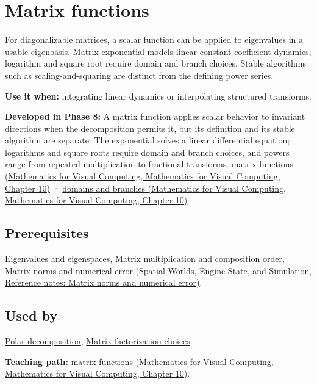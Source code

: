 \hypertarget{appendix-0f4bc2bf2b1f}{}\label{referencestart:appendix-0f4bc2bf2b1f}
\section{Matrix functions}\label{appendix-0f4bc2bf2b1f-matrix-functions}

For diagonalizable matrices, a scalar function can be applied to eigenvalues in a usable eigenbasis. Matrix exponential models linear constant-coefficient dynamics; logarithm and square root require domain and branch choices. Stable algorithms such as scaling-and-squaring are distinct from the defining power series.

\textbf{Use it when:} integrating linear dynamics or interpolating structured transforms.

\textbf{Developed in Phase 8:} A matrix function applies scalar behavior to invariant directions when the decomposition permits it, but its definition and its stable algorithm are separate. The exponential solves a linear differential equation; logarithms and square roots require domain and branch choices, and powers range from repeated multiplication to fractional transforms. \href{../02-Mathematics-for-Visual-Computing/main.pdf\#nameddest=02-foundations-ii-ch026-matrix-functions-turn-repeated-linear-actions-into-one-operator}{matrix functions (Mathematics for Visual Computing, Mathematics for Visual Computing, Chapter 10)} · \href{../02-Mathematics-for-Visual-Computing/main.pdf\#nameddest=02-foundations-ii-ch026-logarithms-and-square-roots-need-domains-and-branches}{domains and branches (Mathematics for Visual Computing, Mathematics for Visual Computing, Chapter 10)}

\subsection{Prerequisites}\label{appendix-0f4bc2bf2b1f-prerequisites}

\hyperref[appendix-0b3be18411f9]{Eigenvalues and eigenspaces}, \hyperref[appendix-ab31ef447dbf]{Matrix multiplication and composition order}, \href{../05-Spatial-Worlds-Engine-State-and-Simulation/main.pdf\#nameddest=appendix-f8657bac66e5}{Matrix norms and numerical error (Spatial Worlds, Engine State, and Simulation, Reference notes: Matrix norms and numerical error)}.

\subsection{Used by}\label{appendix-0f4bc2bf2b1f-used-by}

\hyperref[appendix-73f5bcf7a462]{Polar decomposition}, \hyperref[appendix-221a483bec2d]{Matrix factorization choices}.

\textbf{Teaching path:} \href{../02-Mathematics-for-Visual-Computing/main.pdf\#nameddest=02-foundations-ii-ch026-matrix-functions-turn-repeated-linear-actions-into-one-operator}{matrix functions (Mathematics for Visual Computing, Mathematics for Visual Computing, Chapter 10)}.
